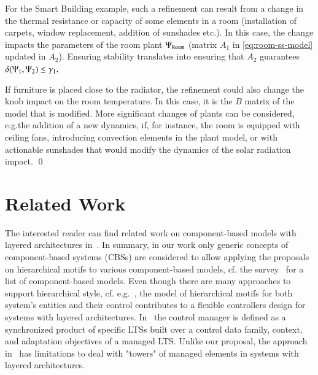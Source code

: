 \documentclass[runningheads]{llncs}
\makeatletter
\newcommand{\eg}[1][\@ ]{e.g.{#1}}
\newcommand{\etc}[1][\@ ]{etc.{#1}}
\newcommand{\plant}[1][]{\Psi\ifx#1\relax\else^{#1}\fi}
\newcommand{\margin}[1][]{\gamma\ifx#1\relax\else^{#1}\fi}
\newcommand{\predicatename}[1]{\mathtt{#1}}
\makeatother
\begin{document}
\begin{example}
For the Smart Building example, such a refinement can result from a change in the thermal resistance or capacity of some elements in a room (installation of carpets, window replacement, addition of sunshades \etc[]). In this case, the change impacts the parameters of the room plant \(\plant_{\predicatename{Room}}\) (matrix \(A_1\) in \cref{eq:room-ss-model} updated in $A_2$).
%
Ensuring stability
translates into ensuring that $A_2$ guarantees 
\(
\delta(\plant_1,\plant_2)  \leq \margin_1.
\)

If furniture is placed close to the radiator, the refinement could also change the knob impact on the room temperature. In this case, it is the \(B\) matrix of the model that is modified.
%
More significant changes of plants can be considered, \eg the addition of a new dynamics, if, for instance, the room is equipped with ceiling fans, introducing convection elements in the plant model, or with actionable sunshades that would modify the dynamics of the solar radiation impact.
  \qed
\end{example}



\section{Related Work}
\label{secn:discussion} 

The interested reader can find related work on component-based models with layered architectures in~\cite{BCK26-Motifs}. 
In summary, in our work only generic concepts of component-based systems (CBSs) are considered to allow applying the proposals on hierarchical motifs to various component-based models, cf. the survey~\cite{CoullonHLR24} for a list of component-based models. Even though there are many approaches to support hierarchical style, cf. \eg~\cite{fractal,BaudeCDDGHP09,DingCL08,BuresHP06,BasuBBCJNS11,ballouliBBS18}, 
the model of hierarchical motifs for both system's entities and their control contributes to a flexible controllers design for systems with layered architectures.
%
In~\cite{BruniCGLV12-Adaptation} the control manager is defined as a synchronized product of specific LTSs built over a control data family, context, and adaptation objectives of a managed LTS.   
Unlike our proposal, the approach in~\cite{BruniCGLV12-Adaptation} has limitations to deal with "towers" of managed elements in systems with layered architectures. 
\end{document}
